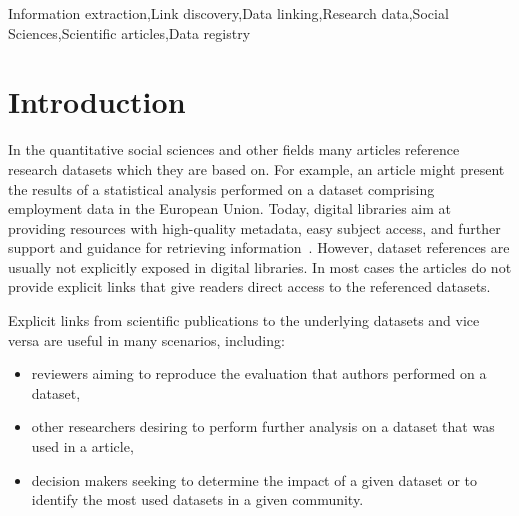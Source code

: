 \documentclass{IOS-Book-Article}
\begin{document}
\begin{frontmatter}
\begin{abstract}
\end{abstract}

\begin{keyword}
Information extraction\sep Link discovery\sep Data linking\sep Research data\sep Social Sciences\sep Scientific articles\sep Data registry
\end{keyword}
\end{frontmatter}
\section{Introduction}
In the quantitative social sciences and other fields many articles reference research datasets which they are based on.
For example, an article might present the results of a statistical analysis performed on a dataset comprising employment data in the European Union.
Today, digital libraries aim at providing resources with high-quality metadata, easy subject access, and further support and guidance for retrieving information~\citep{Hienert2015}. However, dataset references are usually not explicitly exposed in digital libraries.
In most cases the articles do not provide explicit links that give readers direct access to the referenced datasets. 

Explicit links from scientific publications to the underlying datasets and vice versa are useful in many scenarios, including:
\begin{itemize}
	\item reviewers aiming to reproduce the evaluation that authors performed on a dataset, 
	\item other researchers desiring to perform further analysis on a dataset that was used in a article,
	\item decision makers seeking to determine the impact of a given dataset or to identify the most used datasets in a given community.
\end{itemize}
\end{document}
